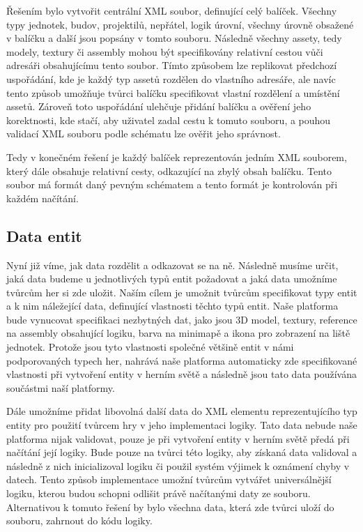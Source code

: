 Řešením bylo vytvořit centrální XML soubor, definující celý balíček. Všechny typy jednotek, budov, projektilů, nepřátel, logik úrovní, všechny úrovně obsažené v balíčku a další jsou popsány v tomto souboru. Následně všechny assety, tedy modely, textury či assembly mohou být specifikovány relativní cestou vůči adresáři obsahujícímu tento soubor. Tímto způsobem lze replikovat předchozí uspořádání, kde je každý typ assetů rozdělen do vlastního adresáře, ale navíc tento způsob umožňuje tvůrci balíčku specifikovat vlastní rozdělení a umístění assetů. Zároveň toto uspořádání ulehčuje přidání balíčku a ověření jeho korektnosti, kde stačí, aby uživatel zadal cestu k tomuto souboru, a pouhou validací XML souboru podle schématu lze ověřit jeho správnost.

Tedy v konečném řešení je každý balíček reprezentován jedním XML souborem, který dále obsahuje relativní cesty, odkazující na zbylý obsah balíčku. Tento soubor má formát daný pevným schématem a tento formát je kontrolován při každém načítání. 

\subsection{Data entit}
Nyní již víme, jak data rozdělit a odkazovat se na ně. Následně musíme určit, jaká data budeme u jednotlivých typů entit požadovat a jaká data umožníme tvůrcům her si zde uložit. Naším cílem je umožnit tvůrcům specifikovat typy entit a k nim náležející data, definující vlastnosti těchto typů entit. Naše platforma bude vynucovat specifikaci nezbytných dat, jako jsou 3D model, textury, reference na assembly obsahující logiku, barva na minimapě a ikona pro zobrazení na liště jednotek. Protože jsou tyto vlastnosti společné většině entit v námi podporovaných typech her, nahrává naše platforma automaticky zde specifikované vlastnosti při vytvoření entity v herním světě a následně jsou tato data používána součástmi naší platformy. 

Dále umožníme přidat libovolná další data do XML elementu reprezentujícího typ entity pro použití tvůrcem hry v jeho implementaci logiky. Tato data nebude naše platforma nijak validovat, pouze je při vytvoření entity v herním světě předá při načítání její logiky. Bude pouze na tvůrci této logiky, aby získaná data validoval a následně z nich inicializoval logiku či použil systém výjimek k oznámení chyby v datech. Tento způsob implementace umožní tvůrcům vytvářet universálnější logiku, kterou budou schopni odlišit právě načítanými daty ze souboru. Alternativou k tomuto řešení by bylo všechna data, která zde tvůrci uloží do souboru, zahrnout do kódu logiky.

